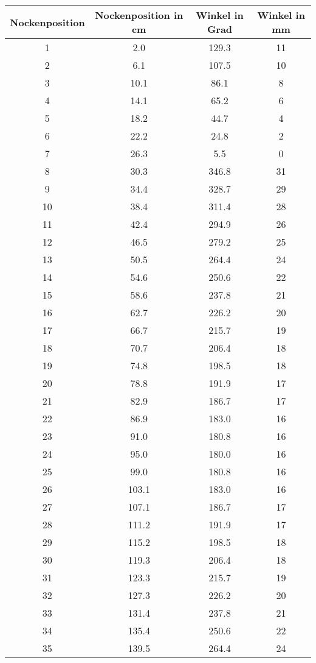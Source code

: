 \documentclass[10pt, a4paper]{article}
\begin{document}
\begin{center}
	\begin{tabular}{c|c|c|c}
		Nockenposition & Nockenposition in cm & Winkel in Grad & Winkel in mm \\
		\hline
		1 & 2.0 & 129.3 & 11 \\
		2 & 6.1 & 107.5 & 10 \\
		3 & 10.1 & 86.1 & 8 \\
		4 & 14.1 & 65.2 & 6 \\
		5 & 18.2 & 44.7 & 4 \\
		6 & 22.2 & 24.8 & 2 \\
		7 & 26.3 & 5.5 & 0 \\
		8 & 30.3 & 346.8 & 31 \\
		9 & 34.4 & 328.7 & 29 \\
		10 & 38.4 & 311.4 & 28 \\
		11 & 42.4 & 294.9 & 26 \\
		12 & 46.5 & 279.2 & 25 \\
		13 & 50.5 & 264.4 & 24 \\
		14 & 54.6 & 250.6 & 22 \\
		15 & 58.6 & 237.8 & 21 \\
		16 & 62.7 & 226.2 & 20 \\
		17 & 66.7 & 215.7 & 19 \\
		18 & 70.7 & 206.4 & 18 \\
		19 & 74.8 & 198.5 & 18 \\
		20 & 78.8 & 191.9 & 17 \\
		21 & 82.9 & 186.7 & 17 \\
		22 & 86.9 & 183.0 & 16 \\
		23 & 91.0 & 180.8 & 16 \\
		24 & 95.0 & 180.0 & 16 \\
		25 & 99.0 & 180.8 & 16 \\
		26 & 103.1 & 183.0 & 16 \\
		27 & 107.1 & 186.7 & 17 \\
		28 & 111.2 & 191.9 & 17 \\
		29 & 115.2 & 198.5 & 18 \\
		30 & 119.3 & 206.4 & 18 \\
		31 & 123.3 & 215.7 & 19 \\
		32 & 127.3 & 226.2 & 20 \\
		33 & 131.4 & 237.8 & 21 \\
		34 & 135.4 & 250.6 & 22 \\
		35 & 139.5 & 264.4 & 24 \\

\end{tabular}
\end{center}
\end{document}
